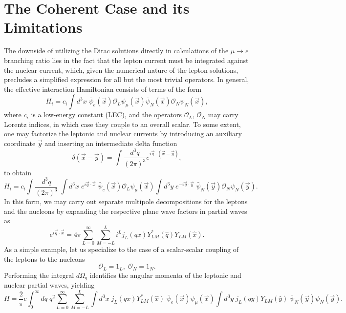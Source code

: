 \documentclass{book}[letterpaper,12pt]
\begin{document}
\section{The Coherent Case and its Limitations}
The downside of utilizing the Dirac solutions directly in calculations of the $\mu\rightarrow e$ branching ratio lies in the fact that the lepton current must be integrated against the nuclear current, which, given the numerical nature of the lepton solutions, precludes a simplified expression for all but the most trivial operators. In general, the effective interaction Hamiltonian consists of terms of the form
\begin{equation}
H_i= c_i \int d^3 x \;\bar{\psi}_e(\vec{x})\mathcal{O}_L\psi_{\mu}(\vec{x})\bar{\psi}_N(\vec{x})\mathcal{O}_N\psi_N(\vec{x}),
\end{equation}
where $c_i$ is a low-energy constant (LEC), and the operators $\mathcal{O}_L$, $\mathcal{O}_N$ may carry Lorentz indices, in which case they couple to an overall scalar. To some extent, one may factorize the leptonic and nuclear currents by introducing an auxiliary  coordinate $\vec{y}$ and inserting an intermediate delta function
\begin{equation}
\delta(\vec{x}-\vec{y})=\int \frac{d^3q}{(2\pi)^3}e^{i\vec{q}\cdot(\vec{x}-\vec{y})},
\end{equation}
to obtain
\begin{equation}
H_i=c_i\int \frac{d^3q}{(2\pi)^3}\;\int d^3x\;e^{i\vec{q}\cdot\vec{x}}\;\bar{\psi}_e(\vec{x})\mathcal{O}_L\psi_\mu(\vec{x})\int d^3y\;e^{-i\vec{q}\cdot\vec{y}}\;\bar{\psi}_N(\vec{y})\mathcal{O}_N\psi_N(\vec{y}).
\end{equation}
In this form, we may carry out separate multipole decompositions for the leptons and the nucleons by expanding the respective plane wave factors in partial waves as
\begin{equation}
e^{i\vec{q}\cdot\vec{x}}=4\pi\sum_{L=0}^{\infty}\sum_{M=-L}^Li^Lj_L(qx)Y_{LM}^*(\hat{q})Y_{LM}(\hat{x}).
\end{equation}
As a simple example, let us specialize to the case of a scalar-scalar coupling of the leptons to the nucleons 
\begin{equation}
\mathcal{O}_L=1_L,\;\mathcal{O}_N=1_N.
\end{equation}
Performing the integral $d\Omega_q$ identifies the angular momenta of the leptonic and nuclear partial waves, yielding
\begin{equation}
H=\frac{2}{\pi}c\int_0^{\infty}dq\;q^2 \sum_{L=0}^{\infty}\sum_{M=-L}^L\int d^3x\;j_L(qx)Y^*_{LM}(\hat{x})\;\bar{\psi}_e(\vec{x})\psi_{\mu}(\vec{x})\int d^3y\;j_L(qy)Y_{LM}(\hat{y})\;\bar{\psi}_N(\vec{y})\psi_N(\vec{y}).
\label{eq:H_full_multi}
\end{equation}
\end{document}
